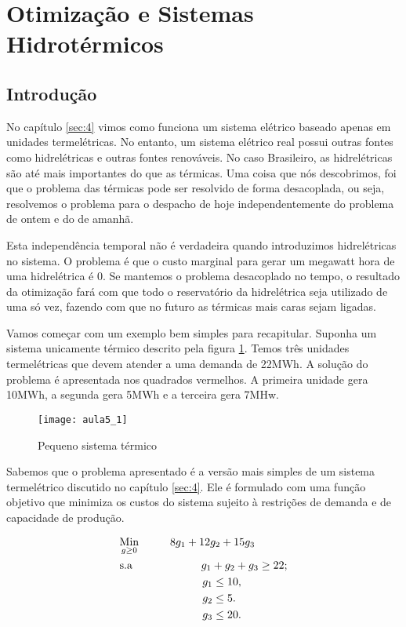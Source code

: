 \section{Otimização e Sistemas Hidrotérmicos}

\subsection{Introdução}

No capítulo \ref{sec:4} vimos como funciona um sistema elétrico baseado apenas em unidades termelétricas. No entanto, um sistema elétrico real possui outras fontes como hidrelétricas e outras fontes renováveis. No caso Brasileiro, as hidrelétricas são até mais importantes do que as térmicas. Uma coisa que nós descobrimos, foi que o problema das térmicas pode ser resolvido de forma desacoplada, ou seja, resolvemos o problema para o despacho de hoje independentemente do problema de ontem e do de amanhã. 

Esta independência temporal não é verdadeira quando introduzimos hidrelétricas no sistema. O problema é que o custo marginal para gerar um megawatt hora de uma hidrelétrica é 0. Se mantemos o problema desacoplado no tempo, o resultado da otimização fará com que todo o reservatório da hidrelétrica seja utilizado de uma só vez, fazendo com que no futuro as térmicas mais caras sejam ligadas. 

Vamos começar com um exemplo bem simples para recapitular. Suponha um sistema unicamente térmico descrito pela figura \ref{fig:sist5}. Temos três unidades termelétricas que devem atender a uma demanda de 22MWh. A solução do problema é apresentada nos quadrados vermelhos. A primeira unidade gera 10MWh, a segunda gera 5MWh e a terceira gera 7MHw. 

\begin{figure}[H]
\begin{centering}
\texttt{[image: aula5\_1]}\protect\caption{\label{fig:sist5} Pequeno sistema térmico}
\end{centering}
\end{figure}

Sabemos que o problema apresentado é a versão mais simples de um sistema termelétrico discutido no capítulo \ref{sec:4}. Ele é formulado com uma função objetivo que minimiza os custos do sistema sujeito à restrições de demanda e de capacidade de produção. 

\begin{align}
    & \underset{g\geq0}{\text{Min}} \hspace{1cm} 8g_1+12g_2+15g_3  \\
    & \text{s.a}  \hspace{2.2cm} g_1+g_2+g_3 \geq 22;  \\
    &             \hspace{2.65cm} g_1\leq 10, \\
    &             \hspace{2.65cm} g_2\leq 5. \\
    &             \hspace{2.65cm} g_3\leq 20. 
\end{align}

